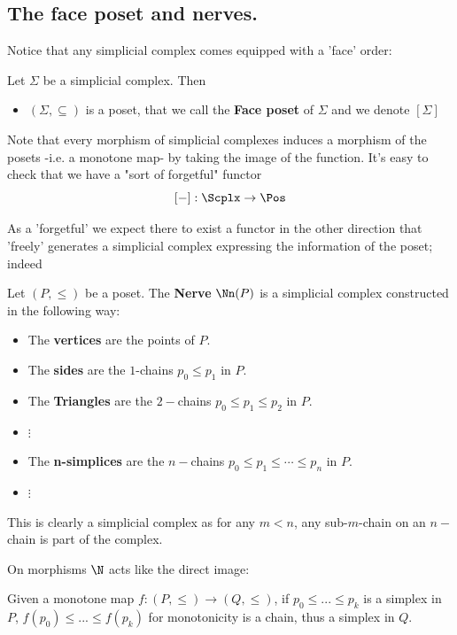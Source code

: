 \subsection{The face poset and nerves.}

Notice that any simplicial complex comes equipped with a 'face' order:

\begin{definition}\hfill

    Let $\Sigma$ be a simplicial complex. Then 
    \begin{itemize}
    \item $(\Sigma,\subseteq)$ is a poset, that we call the \textbf{Face poset} of $\Sigma$ and we denote $[\Sigma]$%
    \end{itemize}
\end{definition}

Note that every morphism of simplicial complexes induces a morphism of the posets -i.e. a monotone map- by taking the image of the function.
It's easy to check that we have a "sort of forgetful" functor 
\[[-]:\Scplx\to \Pos\]

As a 'forgetful' we expect there to exist a functor in the other direction that 'freely' generates a simplicial complex 
expressing the information of the poset; indeed

\begin{definition}\hfill 

    Let $(P,\leq)$ be a poset. The \textbf{Nerve} $\Nn(P)$ is a simplicial complex constructed in the following way:
    \begin{itemize}
        \item  The \textbf{vertices} are the points of $P$.
        \item  The \textbf{sides} are the $1$-chains $p_0\leq p_1$ in $P$.
        \item  The \textbf{Triangles} are the $2-$chains $p_0\leq p_1\leq p_2$ in $P$.
        \item  $\vdots $
        \item The \textbf{n-simplices} are the $n-$chains $p_0\leq p_1\leq\cdots\leq p_n$ in $P$.
        \item $\vdots$
    \end{itemize}

    This is clearly a simplicial complex as for any $m<n$, any sub-$m$-chain on an $n-$chain is part of the complex.

    On morphisms $\N$ acts like the direct image:

    Given a monotone map $f:(P,\leq)\to (Q,\leq)$, if $p_0\leq...\leq p_k$ is a simplex in $P$, $f(p_0)\leq...\leq f(p_k)$ 
    for monotonicity is a chain, thus a simplex in $Q$.
\end{definition}

